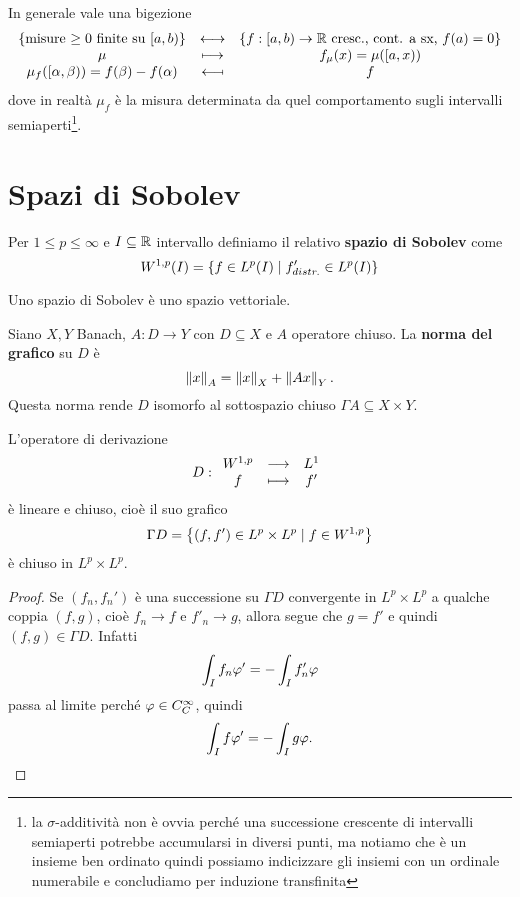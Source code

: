 \begin{remark}
In generale vale una bigezione
\[\begin{array}{ccc} {\left\{{\text{misure $\geq 0$ finite su $[a,b)$}}\right\}} & \longleftrightarrow & {\left\{{f:[a,b)\to\mathbb{R}\text{ cresc., cont. a sx, }f(a)=0}\right\}}\\ {\mu} & \longmapsto & {f_\mu(x)=\mu([a,x))}\\ {\mu_f([\alpha,\beta))=f(\beta)-f(\alpha)} & \longmapsfrom & {f} \end{array}\]
dove in realt\`a $\mu_f$ \`e la misura determinata da quel comportamento sugli intervalli semiaperti\footnote{la $\sigma$-additivit\`a non \`e ovvia perch\'e una successione crescente di intervalli semiaperti potrebbe accumularsi in diversi punti, ma notiamo che \`e un insieme ben ordinato quindi possiamo indicizzare gli insiemi con un ordinale numerabile e concludiamo per induzione transfinita}.
\end{remark}


\section{Spazi di Sobolev}
\begin{definition}
Per $1 \leq p\leq\infty$ e $I\subseteq \mathbb{R}$ intervallo definiamo il relativo \textbf{spazio di Sobolev} come
\[W^{1,p}(I)=\left\{{f\in L^p(I)\mid f'_{distr.}\in L^p(I)}\right\}\]
\end{definition}
\begin{remark}
Uno spazio di Sobolev \`e uno spazio vettoriale.
\end{remark}

\begin{definition}
Siano $X,Y$ Banach, $A:D\to Y$ con $D\subseteq X$ e $A$ operatore chiuso. La \textbf{norma del grafico} su $D$ \`e 
\[\left\Vert{x}\right\Vert_A=\left\Vert{x}\right\Vert_X+\left\Vert{Ax}\right\Vert_Y.\]
Questa norma rende $D$ isomorfo al sottospazio chiuso $\Gamma A\subseteq X\times Y$.
\end{definition}

\begin{proposition}[]\label{PrOperatoreDiDerivazioneSuSobolevHaGraficoChiuso}
L'operatore di derivazione
\[D:\begin{array}{ccc} {W^{1,p}} & \longrightarrow & {L^1}\\ {f} & \longmapsto & {f'} \end{array}\]
\`e lineare e chiuso, cio\`e il suo grafico
\[\Gamma D=\left\{{(f,f')\in L^p\times L^p\mid f\in W^{1,p}}\right\}\]
\`e chiuso in $L^p\times L^p$.
\end{proposition}
\begin{proof}
Se $(f_n,f_n')$ \`e una successione su $\Gamma D$ convergente in $L^p\times L^p$ a qualche coppia $(f,g)$, cio\`e $f_n\to f$ e $f'_n\to g$, allora segue che $g=f'$ e quindi $(f,g)\in \Gamma D$. Infatti
\[\int_I f_n\varphi'=-\int_I f_n'\varphi\]
passa al limite perch\'e $\varphi\in C^\infty_C$, quindi
\[\int_I f\varphi'=-\int_I g\varphi.\]
\end{proof}

